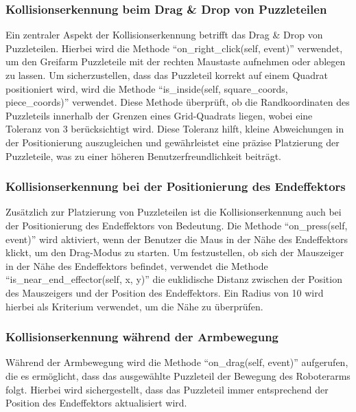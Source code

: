\documentclass[12pt]{article}
\begin{document}
    \subsubsection{Kollisionserkennung beim Drag \& Drop von Puzzleteilen}
    Ein zentraler Aspekt der Kollisionserkennung betrifft das Drag & Drop von Puzzleteilen. Hierbei wird
    die Methode “on\_right\_click(self, event)” verwendet, um den Greifarm Puzzleteile mit der rechten
    Maustaste aufnehmen oder ablegen zu lassen. Um sicherzustellen, dass das Puzzleteil korrekt auf
    einem Quadrat positioniert wird, wird die Methode “is\_inside(self, square\_coords, piece\_coords)”
    verwendet. Diese Methode überprüft, ob die Randkoordinaten des Puzzleteils innerhalb der Grenzen
    eines Grid-Quadrats liegen, wobei eine Toleranz von 3 berücksichtigt wird. Diese Toleranz hilft,
    kleine Abweichungen in der Positionierung auszugleichen und gewährleistet eine präzise Platzierung
    der Puzzleteile, was zu einer höheren Benutzerfreundlichkeit beiträgt.

    \subsubsection{Kollisionserkennung bei der Positionierung des Endeffektors}
    Zusätzlich zur Platzierung von Puzzleteilen ist die Kollisionserkennung auch bei der Positionierung
    des Endeffektors von Bedeutung. Die Methode “on\_press(self, event)” wird aktiviert, wenn der Benutzer
    die Maus in der Nähe des Endeffektors klickt, um den Drag-Modus zu starten. Um festzustellen, ob sich
    der Mauszeiger in der Nähe des Endeffektors befindet, verwendet die Methode
    “is\_near\_end\_effector(self, x, y)” die euklidische Distanz zwischen der Position des Mauszeigers und
    der Position des Endeffektors. Ein Radius von 10 wird hierbei als Kriterium verwendet, um die Nähe
    zu überprüfen.

    \subsubsection{Kollisionserkennung während der Armbewegung}
    Während der Armbewegung wird die Methode “on\_drag(self, event)” aufgerufen, die es ermöglicht, dass
    das ausgewählte Puzzleteil der Bewegung des Roboterarms folgt. Hierbei wird sichergestellt, dass das
    Puzzleteil immer entsprechend der Position des Endeffektors aktualisiert wird.
\end{document}
